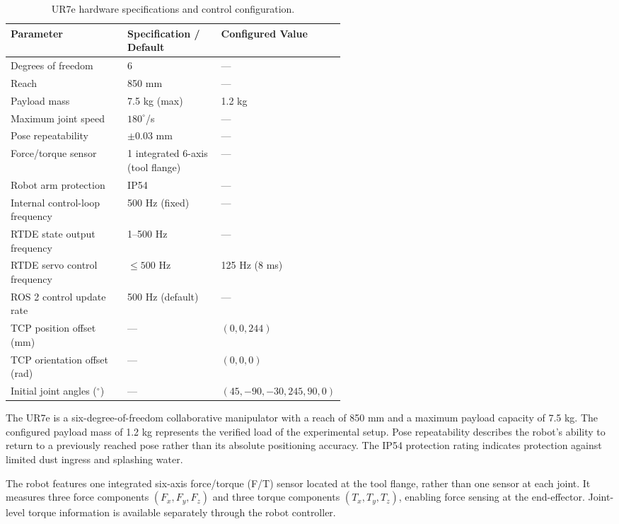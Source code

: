 \documentclass[11pt,a4paper]{article}
\begin{document}
\begin{table}[htbp]
\centering
\caption{UR7e hardware specifications and control configuration.}
\label{tab:ur7e_specs}
\small
\renewcommand{\arraystretch}{1.1}
\begin{tabularx}{\linewidth}{@{}>{\raggedright\arraybackslash}X p{0.28\linewidth} p{0.27\linewidth}@{}}
\toprule
\textbf{Parameter} & \textbf{Specification / Default} & \textbf{Configured Value} \\
\midrule
Degrees of freedom & 6 & --- \\
Reach & 850 mm & --- \\
Payload mass & 7.5 kg (max) & 1.2 kg \\
Maximum joint speed & $180^\circ$/s & --- \\
Pose repeatability & $\pm 0.03$ mm & --- \\
Force/torque sensor & 1 integrated 6-axis (tool flange) & --- \\
Robot arm protection & IP54 & --- \\
\midrule
Internal control-loop frequency & 500 Hz (fixed) & --- \\
RTDE state output frequency & 1--500 Hz & --- \\
RTDE servo control frequency & $\leq 500$ Hz & 125 Hz (8 ms) \\
ROS 2 control update rate & 500 Hz (default) & --- \\
\midrule
TCP position offset (mm) & --- & $(0, 0, 244)$ \\
TCP orientation offset (rad) & --- & $(0, 0, 0)$ \\
Initial joint angles ($^\circ$) & --- & $(45, -90, -30, 245, 90, 0)$ \\
\bottomrule
\end{tabularx}
\end{table}

The UR7e is a six-degree-of-freedom collaborative manipulator with a reach of 850 mm and a maximum payload capacity of 7.5 kg. The configured payload mass of 1.2 kg represents the verified load of the experimental setup. Pose repeatability describes the robot's ability to return to a previously reached pose rather than its absolute positioning accuracy. The IP54 protection rating indicates protection against limited dust ingress and splashing water.

The robot features one integrated six-axis force/torque (F/T) sensor located at the tool flange, rather than one sensor at each joint. It measures three force components $(F_x, F_y, F_z)$ and three torque components $(T_x, T_y, T_z)$, enabling force sensing at the end-effector. Joint-level torque information is available separately through the robot controller.
\end{document}
